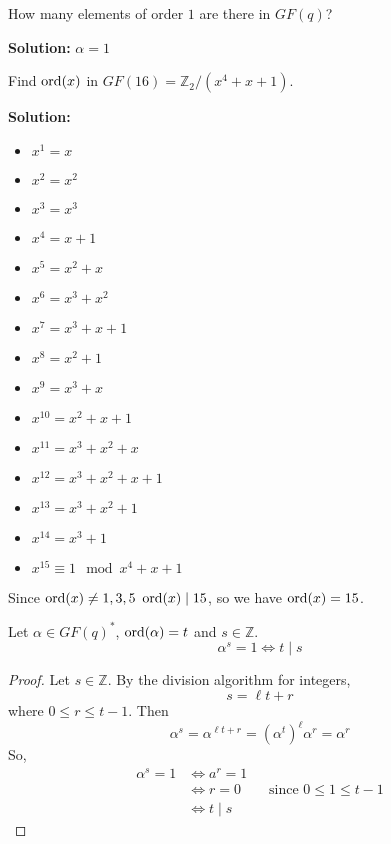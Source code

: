 \begin{exbox}
    \begin{example}
        How many elements of order $ 1 $ are there in $ GF(q) $?

        \textbf{Solution:} $ \alpha=1 $
    \end{example}
\end{exbox}

\begin{exbox}
    \begin{example}
        Find $ \operatorname{ord}(x) $ in $ GF(16)=\mathbb{Z}_2/(x^4+x+1) $.

        \textbf{Solution:}
        \begin{itemize}
            \item $ x^1=x $
            \item $ x^2=x^2 $
            \item $ x^3=x^3 $
            \item $ x^4=x+1 $
            \item $ x^5=x^2+x $
            \item $ x^6=x^3+x^2 $
            \item $ x^7=x^3+x+1 $
            \item $ x^8=x^2+1 $
            \item $ x^9=x^3+x $
            \item $ x^{10}=x^2+x+1 $
            \item $ x^{11}=x^3+x^2+x $
            \item $ x^{12}=x^3+x^2+x+1 $
            \item $ x^{13}=x^3+x^2+1 $
            \item $ x^{14}=x^3+1 $
            \item $ x^15\equiv 1\mod x^4+x+1 $
        \end{itemize}
        Since $ \operatorname{ord}(x)\neq 1,3,5 $ $ \operatorname{ord}(x)\mid 15 $, so we have $ \operatorname{ord}(x)=15 $.
    \end{example}
\end{exbox}

\begin{thmbox}
    \begin{lemma}
        Let $ \alpha\in GF(q)^* $, $ \operatorname{ord}(\alpha)=t $ and $ s\in\mathbb{Z} $.
        \[ \alpha^s=1\iff t\mid s \]
    \end{lemma}
\end{thmbox}

\begin{proof}
    Let $ s\in\mathbb{Z} $. By the division algorithm for integers, 
    \[ s=\ell t+r \]
    where $ 0\leqslant r\leqslant t-1 $. Then
    \[ \alpha^s=\alpha^{\ell t+r}=(\alpha^t)^\ell \alpha^r=\alpha^r \]
    So,
    \begin{align*}
        \alpha^s=1 & \iff a^r=1                                             \\
                   & \iff r=0 \qquad\text{since } 0\leqslant 1\leqslant t-1 \\
                   & \iff t\mid s
    \end{align*}
\end{proof}

